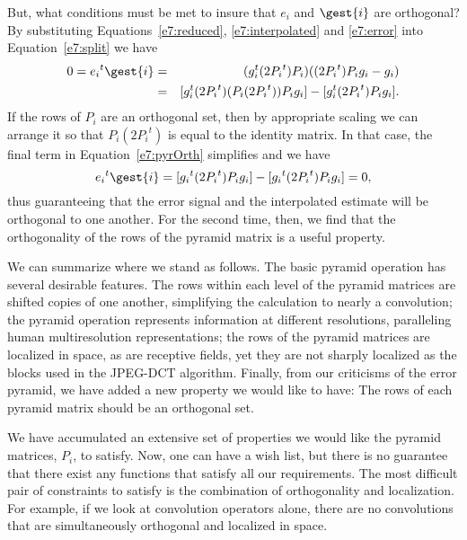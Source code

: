 But, what conditions must be met to insure that $e_i$ and $\gest{i}$
are orthogonal?  By substituting Equations~\ref{e7:reduced},
\ref{e7:interpolated} and \ref{e7:error} into Equation~\ref{e7:split} we have
\begin{eqnarray}
\label{e7:pyrOrth}
0 = {e_i}^t \gest{i}
  & = & ( g_i^t (2 {P_i}^t) P_i ) 
        ( (2 {P_i}^t) P_i g_i -   g_i) \nonumber \\ 
  & = & [ g_i^t (2 {P_i}^t) ( P_i (2 {P_i}^t) ) P_i g_i ] 
    - [ g_i^t (2 {P_i}^t) P_i g_i ] .
\end{eqnarray}
If the rows of $P_i$ are an orthogonal set, then by appropriate
scaling  we can arrange it so that
${P_i} (2 {P_i}^t)$ is equal to the identity matrix.
In that case, the final
term in Equation~\ref{e7:pyrOrth} simplifies and we have
\begin{equation}
{e_i}^t \gest{i} = 
   [ {g_i}^t (2 {P_i}^t) P_i g_i ] - [ {g_i}^t (2 {P_i}^t) P_i g_i ] = 0 ,
\end{equation}
thus guaranteeing that the error signal and the interpolated estimate
will be orthogonal to one another.  For the second time, then, we find
that the orthogonality of the rows of the pyramid matrix is a useful
property.

We can summarize where we stand as follows.  The basic pyramid
operation has several desirable features.  The rows within each level
of the pyramid matrices are shifted copies of one another, simplifying
the calculation to nearly a convolution; the pyramid operation
represents information at different resolutions, paralleling human
multiresolution representations; the rows of the pyramid matrices are
localized in space, as are receptive fields, yet they are not sharply
localized as the blocks used in the JPEG-DCT algorithm.  Finally, from our
criticisms of the error pyramid, we have added a new property we would
like to have: The rows of each pyramid matrix should be an orthogonal set.

We have accumulated an extensive set of properties we would like the
pyramid matrices, $P_i$, to satisfy.  Now, one can have a wish list,
but there is no guarantee that there exist any functions that satisfy
all our requirements.  The most difficult pair of constraints to
satisfy is the combination of orthogonality and localization.  For
example, if we look at convolution operators alone, there are no
convolutions that are simultaneously orthogonal and localized in
space.

